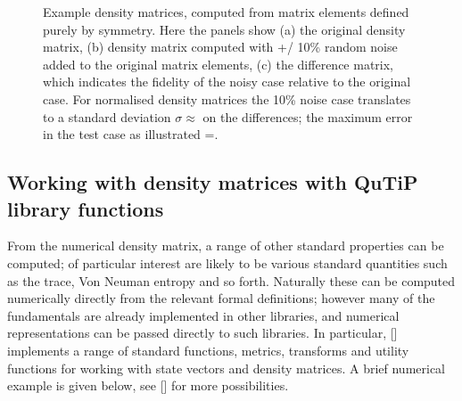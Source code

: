 \documentclass[letterpaper,table,10pt,english]{jupyterBook}
\begin{document}
\begin{figure}[htbp]
\centering
\capstart

\noindent{}
\caption{Example density matrices, computed from matrix elements defined purely by  symmetry. Here the panels show (a) the original density matrix, (b) density matrix computed with +/\sphinxhyphen{} 10\% random noise added to the original matrix elements, (c) the difference matrix, which indicates the fidelity of the noisy case relative to the original case. For normalised density matrices the 10\% noise case translates to a standard deviation \(\sigma\approx\) on the differences; the maximum error in the test case as illustrated =.}\label{\detokenize{part1/theory_density_matrices_310123:fig-denmatd2hcompexample}}\end{figure}


\subsection{Working with density matrices with QuTiP library functions}
\label{\detokenize{part1/theory_density_matrices_310123:working-with-density-matrices-with-qutip-library-functions}}
\sphinxAtStartPar
From the numerical density matrix, a range of other standard properties can be computed; of particular interest are likely to be various standard quantities such as the trace, Von Neuman entropy and so forth. Naturally these can be computed numerically directly from the relevant formal definitions; however many of the fundamentals are already implemented in other libraries, and numerical representations can be passed directly to such libraries. In particular,  {[}{]} implements a range of standard functions, metrics, transforms and utility functions for working with state vectors and density matrices. A brief numerical example is given below, see  {[}{]} for more possibilities.
\end{document}
